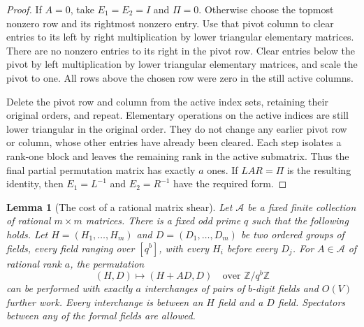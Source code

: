 \documentclass[11pt]{article}
\newtheorem{lemma}[theorem]{Lemma}
\theoremstyle{definition}
\begin{document}
\begin{proof}
If $A=0$, take $E_1=E_2=I$ and $\Pi=0$.  Otherwise choose the topmost
nonzero row and its rightmost nonzero entry.  Use that pivot column to
clear entries to its left by right multiplication by lower triangular
elementary matrices.  There are no nonzero entries to its right in the
pivot row.  Clear entries below the pivot by left multiplication by
lower triangular elementary matrices, and scale the pivot to one.
All rows above the chosen row were zero in the still active columns.

Delete the pivot row and column from the active index sets, retaining
their original orders, and repeat.  Elementary operations on the active
indices are still lower triangular in the original order.  They do not
change any earlier pivot row or column, whose other entries have already
been cleared.  Each step isolates a rank-one block and leaves the
remaining rank in the active submatrix.  Thus the final partial
permutation matrix has exactly $a$ ones.  If $LAR=\Pi$ is the resulting
identity, then $E_1=L^{-1}$ and $E_2=R^{-1}$ have the required form.
\end{proof}

\begin{lemma}[The cost of a rational matrix shear]
\label{lem:matrix-shear}
Let $\mathcal A$ be a fixed finite collection of rational $m\times m$
matrices.  There is a fixed odd prime $q$ such that the following holds.
Let $H=(H_1,\ldots,H_m)$ and $D=(D_1,\ldots,D_m)$ be two ordered
groups of fields, every field ranging over $[q^b]$, with every $H_i$
before every $D_j$.  For $A\in\mathcal A$ of rational rank $a$, the
permutation
\[
 (H,D)\longmapsto(H+AD,D)
 \quad\text{over }\mathbb Z/q^b\mathbb Z
\]
can be performed with exactly $a$ interchanges of pairs of $b$-digit
fields and $O(V)$ further work.  Every interchange is between an $H$
field and a $D$ field.  Spectators between any of the formal fields are
allowed.
\end{lemma}
\end{document}
